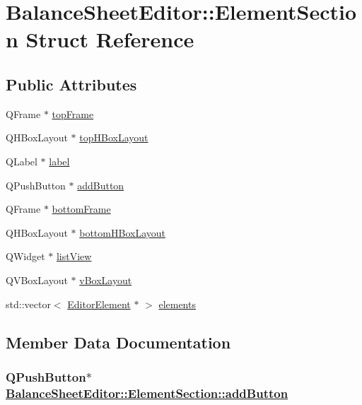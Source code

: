 \hypertarget{structBalanceSheetEditor_1_1ElementSection}{
\section{Balance\-Sheet\-Editor::Element\-Section Struct Reference}
\label{structBalanceSheetEditor_1_1ElementSection}
}
\subsection*{Public Attributes}
\begin{CompactItemize}
\item 
QFrame $\ast$ \hyperlink{structBalanceSheetEditor_1_1ElementSection_o0}{top\-Frame}
\item 
QHBox\-Layout $\ast$ \hyperlink{structBalanceSheetEditor_1_1ElementSection_o1}{top\-HBox\-Layout}
\item 
QLabel $\ast$ \hyperlink{structBalanceSheetEditor_1_1ElementSection_o2}{label}
\item 
QPush\-Button $\ast$ \hyperlink{structBalanceSheetEditor_1_1ElementSection_o3}{add\-Button}
\item 
QFrame $\ast$ \hyperlink{structBalanceSheetEditor_1_1ElementSection_o4}{bottom\-Frame}
\item 
QHBox\-Layout $\ast$ \hyperlink{structBalanceSheetEditor_1_1ElementSection_o5}{bottom\-HBox\-Layout}
\item 
QWidget $\ast$ \hyperlink{structBalanceSheetEditor_1_1ElementSection_o6}{list\-View}
\item 
QVBox\-Layout $\ast$ \hyperlink{structBalanceSheetEditor_1_1ElementSection_o7}{v\-Box\-Layout}
\item 
std::vector$<$ \hyperlink{classEditorElement}{Editor\-Element} $\ast$ $>$ \hyperlink{structBalanceSheetEditor_1_1ElementSection_o8}{elements}
\end{CompactItemize}


\subsection{Member Data Documentation}
\hypertarget{structBalanceSheetEditor_1_1ElementSection_o3}{
\subsubsection[addButton]{\setlength{\rightskip}{0pt plus 5cm}QPush\-Button$\ast$ \hyperlink{structBalanceSheetEditor_1_1ElementSection_o3}{Balance\-Sheet\-Editor::Element\-Section::add\-Button}}}
\label{structBalanceSheetEditor_1_1ElementSection_o3}


